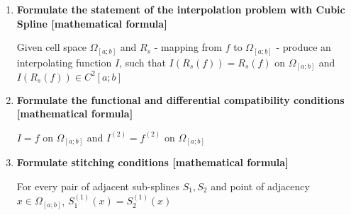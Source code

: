 \documentclass{article}
\begin{document}
\begin{enumerate}
    \item \textbf{Formulate the statement of the interpolation problem with Cubic Spline [mathematical formula]}
    
    Given cell space \begin{math}\Omega_{[a;b]}\end{math} and \begin{math}R_s\end{math} - mapping from \begin{math}f\end{math} to  \begin{math}\Omega_{[a;b]}\end{math} - produce an interpolating function \begin{math}I\end{math}, such that \begin{math}I(R_s(f)) = R_s(f)\end{math} on \begin{math}\Omega_{[a;b]}\end{math} and \begin{math}I(R_s(f)) \in C^{2}{[a;b]} \end{math}
    
    \item \textbf{Formulate the functional and differential compatibility conditions [mathematical formula]}
    
    \begin{math}I = f\end{math} on \begin{math}\Omega_{[a;b]}\end{math} and \begin{math}I^{(2)} = f^{(2)}\end{math} on \begin{math}\Omega_{[a;b]}\end{math}

    \item \textbf{Formulate stitching conditions [mathematical formula]}
    
    For every pair of adjacent sub-splines \begin{math}S_1,S_2\end{math} and point of adjacency \begin{math}x\in\Omega_{[a;b]}\end{math}, \begin{math}S_1^{(1)}(x) = S_2^{(1)}(x)\end{math}


\end{enumerate}
\end{document}
